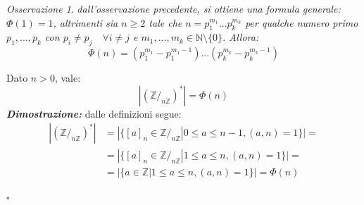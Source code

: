 \documentclass[oneside]{book}
\theoremstyle{remark}
\newtheorem*{osservaz}{Osservazione}
\newcommand{\cvd}{\begin{flushright}$\square$\end{flushright}} %
\begin{document}
\begin{osservaz}
\emph{dall'osservazione precedente, si ottiene una
formula generale: $\Phi(1)=1$, altrimenti sia $n\geq 2$ tale che
$n=p_1^{m_1}...p_k^{m_k}$ per qualche numero primo $p_1,...,p_k$
con $p_i\not = p_j \quad \forall i\not = j$ e $m_1,...,m_k \in \mathbb{N}\setminus\{0\}$.
Allora:}
\[ \Phi(n) = (p_1^{m_1}-p_1^{m_1-1})...(p_k^{m_k}-p_k^{m_k-1}) \]
\end{osservaz}

\begin{tcolorbox}[title={Significato di $\Phi$}]
Dato $n>0$, vale: \[ |(\mathbb{Z}/_{n\mathbb{Z}})^*| = \Phi(n) \]
\textit{\textbf{Dimostrazione:}} dalle definizioni segue:
\begin{align*}
    |(\mathbb{Z}/_{n\mathbb{Z}})^*| &= |\{[a]_n\in\mathbb{Z}/_{n\mathbb{Z}}|0\leq a\leq n-1, (a,n)=1\}| =\\
                                    &= |\{[a]_n\in\mathbb{Z}/_{n\mathbb{Z}}|1\leq a\leq n, (a,n)=1\}|=\\
                                    &= |\{a\in\mathbb{Z}|1\leq a\leq n, (a,n)=1\}| = \Phi(n)
\end{align*}
\cvd
\end{tcolorbox}
\end{document}

